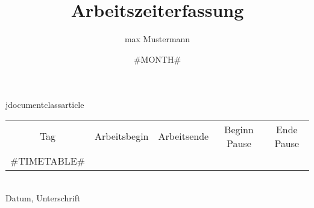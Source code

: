 jdocumentclass{article}
\title{Arbeitszeiterfassung}
\author{max Mustermann}
\date{#MONTH#}

\maketitle
\begin{tabular}{|c|c|c|c|c|}
  \hline
  Tag & Arbeitsbegin & Arbeitsende & Beginn Pause & Ende Pause\\
  #TIMETABLE#
  \hline
\end{tabular}
\vspace{3cm}
\hfill\makebox[2.5in]{\hrulefill}\\
\vspace{-4mm}
\hspace{5.5cm} Datum, Unterschrift

